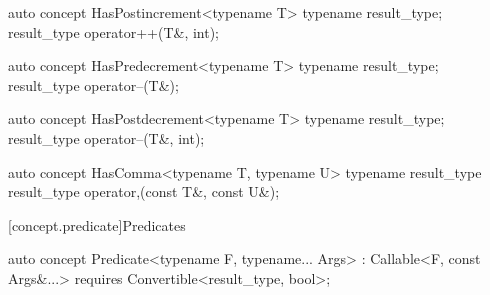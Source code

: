 \documentclass[american,twoside]{book}
\begin{document}
\begin{itemdecl}
auto concept HasPostincrement<typename T> {
  typename result_type;
  result_type operator++(T&, int);
}
\end{itemdecl}

\begin{itemdescr}
\pnum
{}
\end{itemdescr}

\begin{itemdecl}
auto concept HasPredecrement<typename T> {
  typename result_type;
  result_type operator--(T&);
}
\end{itemdecl}

\begin{itemdescr}
\pnum
{}
\end{itemdescr}

\begin{itemdecl}
auto concept HasPostdecrement<typename T> {
  typename result_type;
  result_type operator--(T&, int);
}
\end{itemdecl}

\begin{itemdescr}
\pnum
{}
\end{itemdescr}

\begin{itemdecl}
auto concept HasComma<typename T, typename U> {
  typename result_type
  result_type operator,(const T&, const U&);
}
\end{itemdecl}

\begin{itemdescr}
\pnum
{}
\end{itemdescr}

[concept.predicate]{Predicates}

\begin{itemdecl}
auto concept Predicate<typename F, typename... Args> : Callable<F, const Args&...> {
  requires Convertible<result_type, bool>;
}
\end{itemdecl}

\begin{itemdescr}
\pnum
{}

\pnum
{}
\end{itemdescr}
\end{document}

